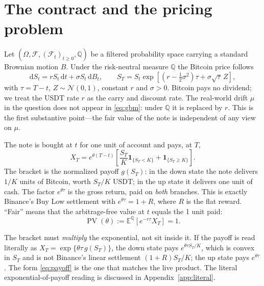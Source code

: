 \documentclass[11pt]{article}
\newcommand{\N}{\mathcal{N}}
\newcommand{\E}{\mathbb{E}}
\newcommand{\Q}{\mathbb{Q}}
\newcommand{\dd}{\mathrm{d}}
\newcommand{\PV}{\operatorname{PV}}
\newcommand{\ind}[1]{\mathbf{1}_{\{#1\}}}
\begin{document}
\section{The contract and the pricing problem}

Let $(\Omega,\mathcal{F},(\mathcal{F}_t)_{t\ge0},\Q)$ be a filtered probability space carrying a standard Brownian motion $B$. Under the risk-neutral measure $\Q$ the Bitcoin price follows
\begin{equation}\label{eq:gbm}
\dd S_t=r S_t\,\dd t+\sigma S_t\,\dd B_t,
\qquad
S_T=S_t\exp\!\left[\left(r-\tfrac12\sigma^2\right)\tau+\sigma\sqrt{\tau}\,Z\right],
\end{equation}
with $\tau=T-t$, $Z\sim\N(0,1)$, constant $r$ and $\sigma>0$. Bitcoin pays no dividend; we treat the USDT rate $r$ as the carry and discount rate. The real-world drift $\mu$ in the question does not appear in \eqref{eq:gbm}: under $\Q$ it is replaced by $r$. This is the first substantive point---the fair value of the note is independent of any view on $\mu$.

The note is bought at $t$ for one unit of account and pays, at $T$,
\begin{equation}\label{eq:payoff}
X_T=e^{\theta(T-t)}\left[\frac{S_T}{K}\ind{S_T<K}+\ind{S_T\ge K}\right].
\end{equation}
The bracket is the normalized payoff $g(S_T)$: in the down state the note delivers $1/K$ units of Bitcoin, worth $S_T/K$ USDT; in the up state it delivers one unit of cash. The factor $e^{\theta\tau}$ is the gross return, paid on \emph{both} branches. This is exactly Binance's Buy Low settlement with $e^{\theta\tau}=1+R$, where $R$ is the flat reward. ``Fair'' means that the arbitrage-free value at $t$ equals the 1 unit paid:
\begin{equation}\label{eq:fair}
\PV(\theta):=\E^{\Q}\!\left[e^{-r\tau}X_T\right]=1.
\end{equation}

\begin{tcolorbox}[colback=inkgray!6,colframe=inkgray!55,title=\textbf{A note on the displayed formula}]
The bracket must \emph{multiply} the exponential, not sit inside it. If the payoff is read literally as $X_T=\exp\{\theta\tau\,g(S_T)\}$, the down state pays $e^{\theta\tau S_T/K}$, which is convex in $S_T$ and is not Binance's linear settlement $(1+R)S_T/K$; the up state pays $e^{\theta\tau}$. The form \eqref{eq:payoff} is the one that matches the live product. The literal exponential-of-payoff reading is discussed in Appendix~\ref{app:literal}.
\end{tcolorbox}
\end{document}

